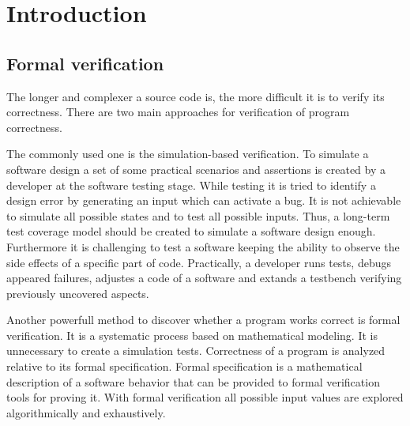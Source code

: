 \chapter{Introduction}
\label{chap:introduction}


\nocite{kopka:band1}
\nocite{raichle:bibtex_programmierung}
\nocite{MiKTeX}
\nocite{KOMA}
\nocite{TeXnicCenter}
\nocite{Marti06}
\nocite{Erbsland08}
\nocite{juergens:einfuehrung}
\nocite{juergens:fortgeschritten}

\section{Formal verification}
\label{sec:formal_verification}

The longer and complexer a source code is, the more difficult it is to verify its correctness.
There are two main approaches for verification of program correctness. 

The commonly used one is the simulation-based verification.
To simulate a software design a set of some practical scenarios and assertions is created by a developer at the software testing stage. 
While testing it is tried to identify a design error by generating an input which can activate a bug.
It is not achievable to simulate all possible states and to test all possible inputs. 
Thus, a long-term test coverage model should be created to simulate a software design enough.
Furthermore it is challenging to test a software keeping the ability to observe the side effects of a specific part of code.
Practically, a developer runs tests, debugs appeared failures, adjustes a code of a software and extands a testbench verifying previously uncovered aspects.\cite{sanghavi:formal_verification}

Another powerfull method to discover whether a program works correct is formal verification. 
It is a systematic process based on mathematical modeling. 
It is unnecessary to create a simulation tests. 
Correctness of a program is analyzed relative to its formal specification.
Formal specification is a mathematical description of a software behavior that can be provided to formal verification tools for proving it.
With formal verification all possible input values are explored algorithmically and exhaustively. \cite{sanghavi:formal_verification}


